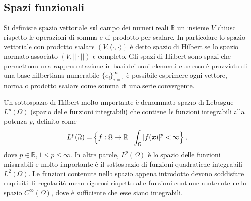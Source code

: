 \subsection{Spazi funzionali}
Si definisce spazio vettoriale sul campo dei numeri reali
$\mathbb{R}$ un insieme $V$ chiuso rispetto le operazioni
di somma e di prodotto per scalare. 
In particolare lo spazio vettoriale con prodotto scalare $(V, \langle \cdot, \cdot \rangle)$ è
detto spazio di Hilbert se lo spazio normato associato 
$(V, ||\cdot||)$ è completo.
Gli spazi di Hilbert sono spazi che permettono una
rappresentazione in basi dei suoi elementi e se esso è provvisto di una base
hilbertiana numerabile $\{e_i\}^\infty_{i=1}$ è possibile
esprimere ogni vettore, norma o prodotto scalare come somma di una serie convergente.

Un sottospazio di Hilbert molto importante è denominato 
spazio di Lebesgue $L^{p}(\Omega)$ (spazio delle funzioni integrabili)
che contiene le funzioni integrabili alla potenza $p$, definito come
\begin{equation}
\ L^{p}(\Omega)= \Bigl\{ f : \Omega \rightarrow \mathbb{R} \mid \int_{\Omega}|f(\vec{x})|^{p}<\infty \Bigr \} \,  ,
\end{equation}
dove $p \in \mathbb{R}, 1\le p \le \infty$. 
In altre parole, $L^{p}(\Omega)$ è lo spazio delle funzioni
misurabili e molto importante è il sottospazio di funzioni 
quadratiche integrabili $L^2(\Omega)$.
Le funzioni contenute nello spazio appena introdotto devono
soddisfare requisiti di regolarità meno rigorosi rispetto 
alle funzioni continue contenute nello spazio $C^\infty(\Omega)$,
dove è sufficiente che esse siano integrabili. 
 
